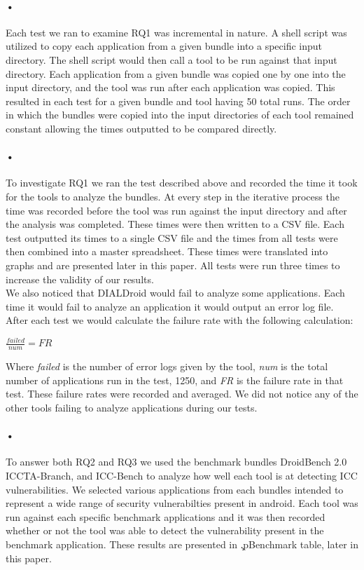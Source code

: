 \documentclass[twocolumn]{article}
\begin{document}
\paragraph{•}
	Each test we ran to examine RQ1 was incremental in nature. A shell script was utilized to copy each application from a given bundle into a specific input directory. The shell script would then call a tool to be run against that input directory. Each application from a given bundle was copied one by one into the input directory, and the tool was run after each application was copied. This resulted in each test for a given bundle and tool having 50 total runs. The order in which the bundles were copied into the input directories of each tool remained constant allowing the times outputted to be compared directly. 
\paragraph{•}
	To investigate RQ1 we ran the test described above and recorded the time it took for the tools to analyze the bundles. At every step in the iterative process the time was recorded before the tool was run against the input directory and after the analysis was completed. These times were then written to a CSV file. Each test outputted its times to a single CSV file and the times from all tests were then combined into a master spreadsheet. These times were translated into graphs and are presented later in this paper. All tests were run three times to increase the validity of our results.\\
	 We also noticed that DIALDroid would fail to analyze some applications. Each time it would fail to analyze an application it would output an error log file. After each test we would calculate the failure rate with the following calculation:\\
	\begin{center}
		\(\frac{failed}{num}=FR\)
	\end{center}
	Where \textit{failed} is the number of error logs given by the tool, \textit{num} is the total number of applications run in the test, 1250, and \textit{FR} is the failure rate  in that test. These failure rates were recorded and averaged. We did not notice any of the other tools failing to analyze applications during our tests.
\paragraph{•}
	To answer both RQ2 and RQ3 we used the benchmark bundles DroidBench 2.0 ICCTA-Branch, and ICC-Bench to analyze how well each tool is at detecting ICC vulnerabilities. We selected various applications from each bundles intended to represent a wide range of security vulnerabilties present in android. Each tool was run against each specific benchmark applications and it was then recorded whether or not the tool was able to detect the vulnerability present in the benchmark application. These results are presented in \c.p{Benchmark table}, later in this paper.
\end{document}
